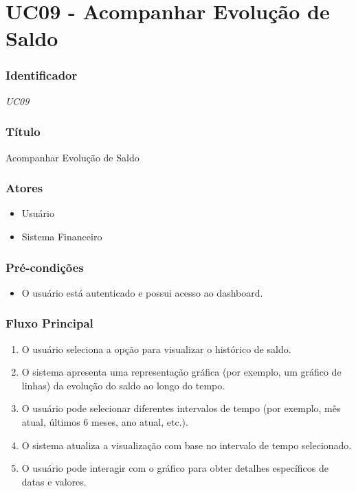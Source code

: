\chapter{UC09 - Acompanhar Evolução de Saldo}
\label{apendiceUC09}

\subsection*{Identificador}
\textit{UC09}

\subsection*{Título}
Acompanhar Evolução de Saldo

\subsection*{Atores}
\begin{addmargin}[1.5cm]{0cm}
    \begin{itemize}
        \item Usuário
        \item Sistema Financeiro
    \end{itemize}
\end{addmargin}

\subsection*{Pré-condições}
\begin{addmargin}[1.5cm]{0cm}
    \begin{itemize}
        \item O usuário está autenticado e possui acesso ao dashboard.
    \end{itemize}
\end{addmargin}

\subsection*{Fluxo Principal}
\begin{addmargin}[1.5cm]{0cm}
    \begin{enumerate}
        \item O usuário seleciona a opção para visualizar o histórico de saldo.
        \item O sistema apresenta uma representação gráfica (por exemplo, um gráfico de linhas) da evolução do saldo ao longo do tempo.
        \item O usuário pode selecionar diferentes intervalos de tempo (por exemplo, mês atual, últimos 6 meses, ano atual, etc.).
        \item O sistema atualiza a visualização com base no intervalo de tempo selecionado.
        \item O usuário pode interagir com o gráfico para obter detalhes específicos de datas e valores.
    \end{enumerate}
\end{addmargin}

